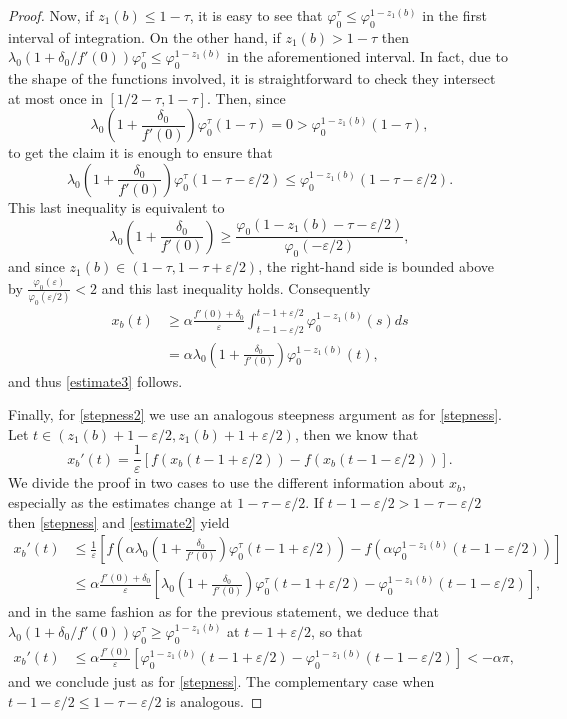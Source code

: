 \documentclass[10pt,a4paper]{amsart}
\begin{document}
\begin{proof}
Now, if $z_1(b)\leq 1-\tau$, it is easy to see that $\varphi_0^{\tau} \leq \varphi_0^{1-z_1(b)}$ in the first interval of integration. On the other hand, if $z_1(b)>1-\tau$ then $\lambda_0(1+\delta_0/f'(0))\varphi_0^\tau \leq \varphi_0^{1-z_1(b)}$ in the aforementioned interval. In fact, due to the shape of the functions involved, it is straightforward to check they intersect at most once in $[1/2-\tau, 1-\tau]$. Then, since
\[
    \lambda_0\left( 1+\frac{\delta_0}{f'(0)} \right) \varphi_0^\tau(1-\tau) = 0 >\varphi_0^{1-z_1(b)}(1-\tau),
\]
to get the claim it is enough to ensure that
\[
    \lambda_0\left( 1+\frac{\delta_0}{f'(0)} \right)\varphi_0^{\tau}(1-\tau-\varepsilon/2)\leq \varphi_0^{1-z_1(b)}(1-\tau-\varepsilon/2).
\]
This last inequality is equivalent to
\[
    \lambda_0\left( 1+\frac{\delta_0}{f'(0)} \right) \geq \frac{\varphi_0(1-z_1(b)-\tau-\varepsilon/2)}{\varphi_0(-\varepsilon/2)},
\]
and since $z_1(b)\in(1-\tau,1-\tau+\varepsilon/2)$, the right-hand side is bounded above by $\frac{\varphi_0(\varepsilon)}{\varphi_0(\varepsilon/2)}< 2$ and this last inequality holds. Consequently
\begin{align*}
    x_b(t) &\geq \alpha\frac{f'(0)+\delta_0}{\varepsilon} \int_{t-1-\varepsilon/2}^{t-1+\varepsilon/2} \varphi_0^{1-z_1(b)}(s) ds \\
    & = \alpha\lambda_0\left( 1+\frac{\delta_0}{f'(0)} \right) \varphi_0^{1-z_1(b)}(t),
\end{align*}
and thus \eqref{estimate3} follows.

Finally, for \eqref{stepness2} we use an analogous steepness argument as for \eqref{stepness}. Let $t\in (z_1(b)+1-\varepsilon/2, z_1(b)+1+\varepsilon/2)$, then we know that
\[
    x_b'(t) = \frac{1}{\varepsilon} [ f(x_b(t-1+\varepsilon/2)) - f(x_b(t-1-\varepsilon/2)) ].
\]
We divide the proof in two cases to use the different information about $x_b$, especially as the estimates change at $1-\tau-\varepsilon/2$. If $t-1-\varepsilon/2>1-\tau-\varepsilon/2$ then \eqref{stepness} and \eqref{estimate2} yield
\begin{align*}
    x_b'(t)& \leq \frac{1}{\varepsilon} \left[ f\left( \alpha\lambda_0\left( 1+\frac{\delta_0}{f'(0)} \right) \varphi_0^\tau(t-1+\varepsilon/2) \right) - f(\alpha\varphi_0^{1-z_1(b)}(t-1-\varepsilon/2)) \right] \\
    & \leq \alpha\frac{f'(0)+\delta_0}{\varepsilon} \left[ \lambda_0\left( 1+\frac{\delta_0}{f'(0)} \right) \varphi_0^\tau(t-1+\varepsilon/2) - \varphi_0^{1-z_1(b)}(t-1-\varepsilon/2) \right],
\end{align*}
and in the same fashion as for the previous statement, we deduce that $\lambda_0(1+\delta_0/f'(0))\varphi_0^\tau \geq \varphi_0^{1-z_1(b)}$ at $t-1+\varepsilon/2$, so that
\begin{align*}
    x_b'(t) &\leq \alpha\frac{f'(0)}{\varepsilon}[\varphi_0^{1-z_1(b)}(t-1+\varepsilon/2) - \varphi_0^{1-z_1(b)}(t-1-\varepsilon/2)] <-\alpha\pi,
\end{align*}
and we conclude just as for \eqref{stepness}. The complementary case when $t-1-\varepsilon/2\leq 1-\tau-\varepsilon/2$ is analogous.
\end{proof}
\end{document}
